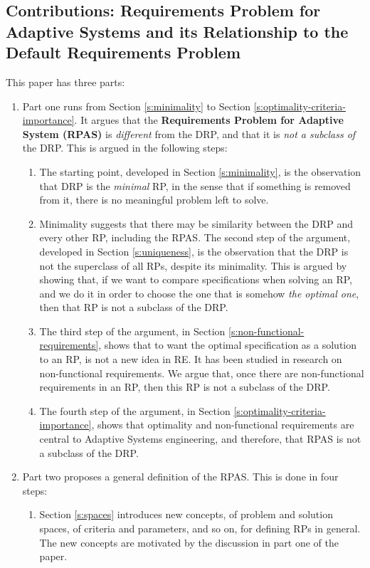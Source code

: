 \documentclass[graybox]{svmult}
\newcommand{\zi}[1]{\textit{#1}}
\newcommand{\xb}[1]{\textbf{#1}}
\newcommand{\RE}{RE}
\newcommand{\RPfull}{Requirements Problem}
\newcommand{\RP}{RP}
\newcommand{\ASfull}{Adaptive System}
\newcommand{\RPASfull}{\RPfull{} for \ASfull}
\newcommand{\RPAS}{RPAS}
\newcommand{\ZJRPfull}{Default \RPfull}
\newcommand{\ZJRP}{DRP}
\begin{document}
\subsection{Contributions: \RPASfull s and its Relationship to the \ZJRPfull}\label{s:introduction:contributions}
This paper has three parts:
\begin{enumerate}
    \item{Part one runs from Section \ref{s:minimality} to Section \ref{s:optimality-criteria-importance}. It argues that the \xb{\RPASfull{} (\RPAS)} is \zi{different} from the \ZJRP, and that it is \zi{not a subclass of} the \ZJRP. This is argued in the following steps:
    \begin{enumerate}
        \item{The starting point, developed in Section \ref{s:minimality}, is the observation that \ZJRP{} is the \zi{minimal} \RP, in the sense that if something is removed from it, there is no meaningful problem left to solve.}
        \item{Minimality suggests that there may be similarity between the \ZJRP{} and every other \RP, including the \RPAS. The second step of the argument, developed in Section \ref{s:uniqueness}, is the observation that the \ZJRP{} is not the superclass of all \RP s, despite its minimality. This is argued by showing that, if we want to compare specifications when solving an \RP, and we do it in order to choose the one that is somehow \zi{the optimal one}, then that \RP{} is not a subclass of the \ZJRP.}
        \item{The third step of the argument, in Section \ref{s:non-functional-requirements}, shows that to want the optimal specification as a solution to an \RP, is not a new idea in \RE. It has been studied in research on non-functional requirements. We argue that, once there are non-functional requirements in an \RP, then this \RP{} is not a subclass of the \ZJRP.}
        \item{The fourth step of the argument, in Section \ref{s:optimality-criteria-importance}, shows that optimality and non-functional requirements are central to \ASfull s engineering, and therefore, that \RPAS{} is not a subclass of the \ZJRP.}
    \end{enumerate}
    }
    \item{Part two proposes a general definition of the \RPAS. This is done in four steps:
    \begin{enumerate}
        \item{Section \ref{s:spaces} introduces new concepts, of problem and solution spaces, of criteria and parameters, and so on, for defining \RP s in general. The new concepts are motivated by the discussion in part one of the paper.}

\end{enumerate}}
\end{enumerate}
\end{document}
